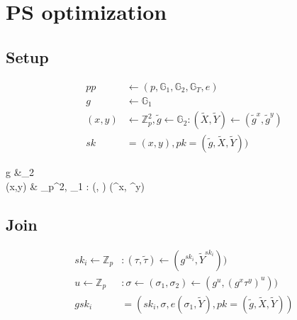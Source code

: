 \documentclass[11pt]{article}
\newenvironment{optimization}{\par\color{blue}}{\par}
\begin{document}
    \section{PS optimization}

    \subsection{Setup}
    \begin{align}
        pp  & \leftarrow (p,\mathbb{G}_1,\mathbb{G}_2,\mathbb{G}_T,e) \\
        g &\leftarrow \mathbb{G}_1\\
        (x,y) &  \leftarrow \mathbb{Z}_p^{2}, \tilde{g} \leftarrow \mathbb{G}_2 :
        (\tilde{X}, \tilde{Y})  \leftarrow (\tilde{g}^x, \tilde{g}^y)\\
        sk &=(x,y), pk=(\tilde{g}, \tilde{X}, \tilde{Y}))
    \end{align}
    \begin{optimization}
        g &\leftarrow {}_2\\
        (x,y) &  \leftarrow {}_p^{2},  \leftarrow {}_1 :
        (, )  \leftarrow (^x, ^y)
    \end{optimization}

    \subsection{Join}
    \begin{align}
        sk_i \leftarrow \mathbb{Z}_p &:
        (\tau, \tilde{\tau})\leftarrow (g^{sk_i}, \tilde{Y}^{sk_i}))\\
        u \leftarrow \mathbb{Z}_p &: \sigma \leftarrow(\sigma_1, \sigma_2) \leftarrow (g^u, (g^x \tau^y )^u))\\
        gsk_i &=(sk_i,\sigma, e(\sigma_1, \tilde{Y}), pk=(\tilde{g}, \tilde{X}, \tilde{Y}))
    \end{align}
\end{document}
